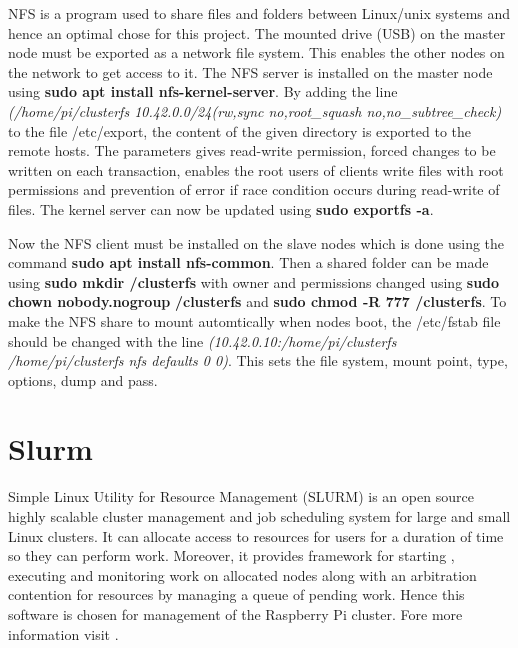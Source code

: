 \documentclass[../Head/Report.tex]{subfiles}
\begin{document}
NFS is a program used to share files and folders between Linux/unix systems and hence an optimal chose for this project. The mounted drive (USB) on the master node must be exported as a network file system. This enables the other nodes on the network to get access to it. The NFS server is installed on the master node using \textbf{sudo apt install nfs-kernel-server}. By adding the line \textit{(/home/pi/clusterfs 10.42.0.0/24(rw,sync no,root\_squash no,no\_subtree\_check)} to the file /etc/export, the content of the given directory is exported to the remote hosts. The parameters gives read-write permission, forced changes to be written on each transaction, enables the root users of clients write files with root permissions and prevention of error if race condition occurs during read-write of files. The kernel server can now be updated using \textbf{sudo exportfs -a}. 

Now the NFS client must be installed on the slave nodes which is done using the command \textbf{sudo apt install nfs-common}. Then a shared folder can be made using \textbf{sudo mkdir /clusterfs} with owner and permissions changed using \textbf{sudo chown nobody.nogroup} \textbf{/clusterfs} and \textbf{sudo chmod -R 777 /clusterfs}. To make the NFS share to mount automtically when nodes boot, the /etc/fstab file should be changed with the line \textit{(10.42.0.10:/home/pi/clusterfs /home/pi/clusterfs nfs defaults 0 0)}. This sets the file system, mount point, type, options, dump and pass. \cite{NFS}

\section{Slurm}
\label{sec:slurm}

Simple Linux Utility for Resource Management (SLURM) is an open source highly scalable cluster management and job scheduling system for large and small Linux clusters. It can allocate access to resources for users for a duration of time so they can perform work. Moreover, it provides framework for starting , executing and monitoring work on allocated nodes along with an arbitration contention for resources by managing a queue of pending work. Hence this software is chosen for management of the Raspberry Pi cluster. Fore more information visit \cite{SLURM}. 
\end{document}
